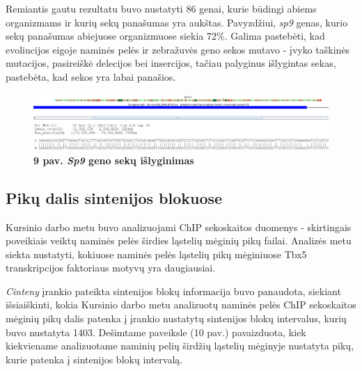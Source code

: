 \documentclass[12pt]{article}
\begin{document}
\newpage

Remiantis gautu rezultatu buvo nustatyti 86 genai, kurie būdingi abiems
organizmams ir kurių sekų panašumas yra aukštas. Pavyzdžiui, \emph{sp9} genas,
kurio sekų panašumas abiejuose organizmuose siekia 72\%. Galima pastebėti, kad
evoliucijos eigoje naminės pelės ir zebražuvės geno sekos mutavo - įvyko
taškinės mutacijos, pasireiškė delecijos bei insercijos, tačiau palyginus
išlygintas sekas, pastebėta, kad sekos yra labai panašios.

\begin{figure}[htb]
    \begin{center}
        \includegraphics[width=1\linewidth]{../Figures/Sp9_gene_alignment.png}
        \vspace{-1\baselineskip}
        \caption*{\small\textbf{9 pav. \emph{Sp9} geno sekų išlyginimas}}
        \label{fig:9}
    \end{center}
\end{figure}

\newpage

\subsection{Pikų dalis sintenijos blokuose}
Kursinio darbo metu buvo analizuojami ChIP sekoskaitos duomenys - skirtingais
poveikiais veiktų naminės pelės širdies ląstelių mėginių pikų failai. Analizės
metu siekta nustatyti, kokiuose naminės pelės ląstelių pikų mėginiuose Tbx5
transkripcijos faktoriaus motyvų yra daugiausiai.

\emph{Cinteny} įrankio pateikta sintenijos blokų informacija buvo panaudota,
siekiant išsiaiškinti, kokia Kursinio darbo metu analizuotų naminės pelės ChIP
sekoskaitos mėginių pikų dalis patenka į įrankio nustatytų sintenijos blokų
intervalus, kurių buvo nustatyta 1403.
Dešimtame paveiksle (10 pav.) pavaizduota, kiek kiekviename analizuotame
naminių pelių širdžių ląstelių mėginyje nustatyta pikų, kurie patenka į
sintenijos blokų intervalą.
\end{document}
